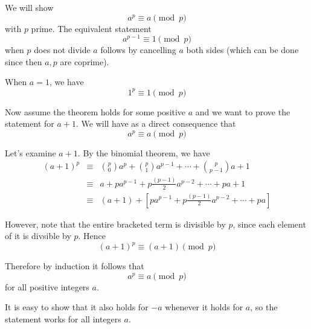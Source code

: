 \documentclass[12pt]{article}
\newcommand{\binomial}[2]{{{#1}\choose{#2}}}
\begin{document}
We will show $$a^{p} \equiv a \pmod{p}$$ with $p$ prime. The equivalent statement $$a^{p-1}\equiv 1 \pmod{p}$$ when $p$ does not divide $a$ follows by cancelling $a$ both sides (which can be done since then $a,p$ are coprime).

When $a=1$, we have $$ 1^{p} \equiv 1 \pmod{p}$$  

Now assume the theorem holds for some positive $a$ and we want to prove the statement for $a+1$. We will have as a direct consequence that 
$$a^p \equiv a \pmod{p}$$

Let's examine $a+1$.  By the binomial theorem, we have
\begin{eqnarray*}
(a+1)^{p} & \equiv & \binomial{p}{0}a^p + \binomial{p}{1}a^{p-1} + \cdots + \binomial{p}{p-1} a + 1  \\
& \equiv & a + pa^{p-1} + p\frac{(p-1)}{2}a^{p-2} + \cdots + p a + 1 \\
& \equiv & (a + 1) + [ pa^{p-1} + p \frac{(p-1)}{2}a^{p-2} + \cdots + p a ] 
\end{eqnarray*}

However, note that the entire bracketed term is divisible by $p$, since each element of it is divsible by $p$.  Hence
$$(a+1)^p \equiv (a+1) \pmod{p}$$

Therefore by induction it follows that
\[a^p\equiv a \pmod{p}\]
for all positive integers $a$.

It is easy to show that it also holds for $-a$ whenever it holds for $a$, so the statement works for all integers $a$.
\end{document}
